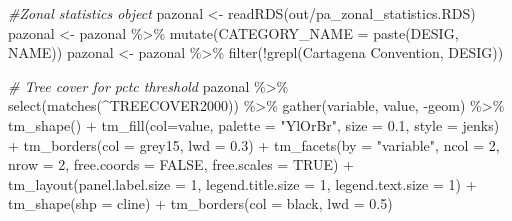 \documentclass[10pt,landscape,a3paper]{article}
\newenvironment{Shaded}{\begin{snugshade}}{\end{snugshade}}
\newcommand{\AttributeTok}[1]{\textcolor[rgb]{0.77,0.63,0.00}{#1}}
\newcommand{\CommentTok}[1]{\textcolor[rgb]{0.56,0.35,0.01}{\textit{#1}}}
\newcommand{\ConstantTok}[1]{\textcolor[rgb]{0.00,0.00,0.00}{#1}}
\newcommand{\DecValTok}[1]{\textcolor[rgb]{0.00,0.00,0.81}{#1}}
\newcommand{\FloatTok}[1]{\textcolor[rgb]{0.00,0.00,0.81}{#1}}
\newcommand{\FunctionTok}[1]{\textcolor[rgb]{0.00,0.00,0.00}{#1}}
\newcommand{\NormalTok}[1]{#1}
\newcommand{\OtherTok}[1]{\textcolor[rgb]{0.56,0.35,0.01}{#1}}
\newcommand{\SpecialCharTok}[1]{\textcolor[rgb]{0.00,0.00,0.00}{#1}}
\newcommand{\StringTok}[1]{\textcolor[rgb]{0.31,0.60,0.02}{#1}}
\begin{document}
\begin{Shaded}
\begin{Highlighting}[]
\CommentTok{\#Zonal statistics object}
\NormalTok{pazonal }\OtherTok{\textless{}{-}} \FunctionTok{readRDS}\NormalTok{(}\StringTok{\textquotesingle{}out/pa\_zonal\_statistics.RDS\textquotesingle{}}\NormalTok{)}
\NormalTok{pazonal }\OtherTok{\textless{}{-}}\NormalTok{ pazonal }\SpecialCharTok{\%\textgreater{}\%} \FunctionTok{mutate}\NormalTok{(}\AttributeTok{CATEGORY\_NAME =} \FunctionTok{paste}\NormalTok{(DESIG, NAME))}
\NormalTok{pazonal }\OtherTok{\textless{}{-}}\NormalTok{ pazonal }\SpecialCharTok{\%\textgreater{}\%} \FunctionTok{filter}\NormalTok{(}\SpecialCharTok{!}\FunctionTok{grepl}\NormalTok{(}\StringTok{\textquotesingle{}Cartagena Convention\textquotesingle{}}\NormalTok{, DESIG))}

\CommentTok{\# Tree cover for pctc threshold}
\NormalTok{pazonal }\SpecialCharTok{\%\textgreater{}\%} \FunctionTok{select}\NormalTok{(}\FunctionTok{matches}\NormalTok{(}\StringTok{\textquotesingle{}\^{}TREECOVER2000\textquotesingle{}}\NormalTok{)) }\SpecialCharTok{\%\textgreater{}\%}
  \FunctionTok{gather}\NormalTok{(variable, value, }\SpecialCharTok{{-}}\NormalTok{geom) }\SpecialCharTok{\%\textgreater{}\%}
  \FunctionTok{tm\_shape}\NormalTok{() }\SpecialCharTok{+}
  \FunctionTok{tm\_fill}\NormalTok{(}\AttributeTok{col=}\StringTok{\textquotesingle{}value\textquotesingle{}}\NormalTok{, }\AttributeTok{palette =} \StringTok{"YlOrBr"}\NormalTok{, }\AttributeTok{size =} \FloatTok{0.1}\NormalTok{, }\AttributeTok{style =} \StringTok{\textquotesingle{}jenks\textquotesingle{}}\NormalTok{) }\SpecialCharTok{+}
  \FunctionTok{tm\_borders}\NormalTok{(}\AttributeTok{col =} \StringTok{\textquotesingle{}grey15\textquotesingle{}}\NormalTok{, }\AttributeTok{lwd =} \FloatTok{0.3}\NormalTok{) }\SpecialCharTok{+}
  \FunctionTok{tm\_facets}\NormalTok{(}\AttributeTok{by =} \StringTok{"variable"}\NormalTok{, }\AttributeTok{ncol =} \DecValTok{2}\NormalTok{, }\AttributeTok{nrow =} \DecValTok{2}\NormalTok{, }\AttributeTok{free.coords =} \ConstantTok{FALSE}\NormalTok{, }\AttributeTok{free.scales =} \ConstantTok{TRUE}\NormalTok{) }\SpecialCharTok{+}
  \FunctionTok{tm\_layout}\NormalTok{(}\AttributeTok{panel.label.size =} \DecValTok{1}\NormalTok{, }\AttributeTok{legend.title.size =} \DecValTok{1}\NormalTok{, }\AttributeTok{legend.text.size =} \DecValTok{1}\NormalTok{) }\SpecialCharTok{+} 
  \FunctionTok{tm\_shape}\NormalTok{(}\AttributeTok{shp =}\NormalTok{ cline) }\SpecialCharTok{+} \FunctionTok{tm\_borders}\NormalTok{(}\AttributeTok{col =} \StringTok{\textquotesingle{}black\textquotesingle{}}\NormalTok{, }\AttributeTok{lwd =} \FloatTok{0.5}\NormalTok{)}
\end{Highlighting}
\end{Shaded}
\end{document}
